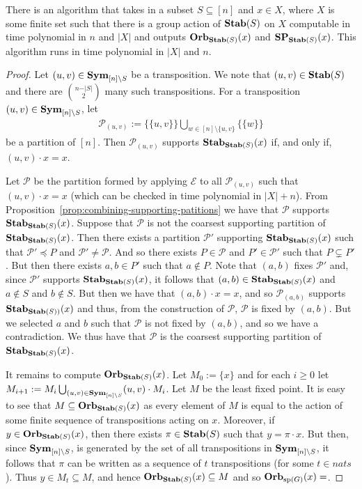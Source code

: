 \documentclass[../paper.tex]{subfiles}
\begin{document}
\begin{lem}
  \label{lem:computing-support-orbit}
  There is an algorithm that takes in a subset $S \subseteq [n]$ and $x \in X$,
  where $X$ is some finite set such that there is a group action of $\text{\textbf{Stab}}(S)$
  on $X$ computable in time polynomial in $n$ and $\vert X \vert$ and outputs
  $\text{\textbf{Orb}}_{\text{\textbf{Stab}}(S)} (x)$ and $\text{\textbf{SP}}_{\text{\textbf{Stab}}(S)}(x)$. This algorithm runs in time
  polynomial in $\vert X \vert$ and $n$.
\end{lem}
\begin{proof}
  Let $(u, v) \in \text{\textbf{Sym}}_{[n] \setminus S}$ be a transposition. We note that
  $(u,v) \in \text{\textbf{Stab}}(S)$ and there are ${n - \vert S \vert}\choose{2}$ many such
  transpositions. For a transposition $(u, v) \in \text{\textbf{Sym}}_{[n] \setminus S}$, let
  \begin{align*}
    \mathcal{P}_{(u,v)} := \{ \{u,v\}\} \bigcup_{w \in [n] \setminus \{ u,v \}} \{ \{ w \} \}
  \end{align*}
  be a partition of $[n]$. Then $\mathcal{P}_{(u,v)}$ supports
  $\text{\textbf{Stab}}_{\text{\textbf{Stab}}(S)}(x)$ if, and only if, $(u,v) \cdot x = x$.

  Let $\mathcal{P}$ be the partition formed by applying $\mathcal{E}$ to all
  $\mathcal{P}_{(u,v)}$ such that $(u,v) \cdot x = x$ (which can be checked in
  time polynomial in $\vert X \vert + n$). From
  Proposition~\ref{prop:combining-supporting-patitions} we have that
  $\mathcal{P}$ supports $\text{\textbf{Stab}}_{\text{\textbf{Stab}}(S)}(x)$. Suppose that $\mathcal{P}$ is
  not the coarsest supporting partition of $\text{\textbf{Stab}}_{\text{\textbf{Stab}}(S)}(x)$. Then there
  exists a partition $\mathcal{P}'$ supporting $\text{\textbf{Stab}}_{\text{\textbf{Stab}}(S)}(x)$ such that
  $\mathcal{P}' \preceq P$ and $\mathcal{P}' \neq \mathcal{P}$. And so there
  exists $P \in \mathcal{P}$ and $P' \in \mathcal{P}'$ such that $P \subsetneq
  P'$. But then there exists $a , b \in P'$ such that $a \not\in P$. Note that
  $(a,b)$ fixes $\mathcal{P}'$ and, since $\mathcal{P}'$ supports
  $\text{\textbf{Stab}}_{\text{\textbf{Stab}}(S)}(x)$, it follows that $(a,b) \in \text{\textbf{Stab}}_{\text{\textbf{Stab}}(S)}(x)$ and $a
  \not\in S$ and $b \not\in S$. But then we have that $(a,b) \cdot x = x$, and
  so $\mathcal{P}_{(a,b)}$ supports $\text{\textbf{Stab}}_{\text{\textbf{Stab}}(S))}(x)$ and thus, from the
  construction of $\mathcal{P}$, $\mathcal{P}$ is fixed by $(a,b)$. But we
  selected $a$ and $b$ such that $\mathcal{P}$ is not fixed by $(a,b)$, and so
  we have a contradiction. We thus have that $\mathcal{P}$ is the coarsest
  supporting partition of $\text{\textbf{Stab}}_{\text{\textbf{Stab}}(S)}(x)$.

  It remains to compute $\text{\textbf{Orb}}_{\text{\textbf{Stab}}(S)}(x)$. Let $M_0 := \{x\}$ and for each $i
  \geq 0$ let $M_{i+1} := M_i \bigcup_{(u,v) \in \text{\textbf{Sym}}_{[n] \setminus S}} (u,v)
  \cdot M_i$. Let $M$ be the least fixed point. It is easy to see that $M
  \subseteq \text{\textbf{Orb}}_{\text{\textbf{Stab}}(S)}(x)$ as every element of $M$ is equal to the action
  of some finite sequence of transpositions acting on $x$. Moreover, if $y \in
  \text{\textbf{Orb}}_{\text{\textbf{Stab}}(S)}(x)$, then there exists $\pi \in \text{\textbf{Stab}}(S)$ such that $y = \pi
  \cdot x$. But then, since $\text{\textbf{Sym}}_{[n] \setminus S}$, is generated by the set of
  all transpositions in $\text{\textbf{Sym}}_{[n] \setminus S}$, it follows that $\pi$ can be
  written as a sequence of $t$ transpositions (for some $t \in nats$). Thus $y
  \in M_t \subseteq M$, and hence $\text{\textbf{Orb}}_{\text{\textbf{Stab}}(S)}(x) \subseteq M$ and so
  $\text{\textbf{Orb}}_{\text{sp}(G)}(x) = $.


\end{proof}
\end{document}

